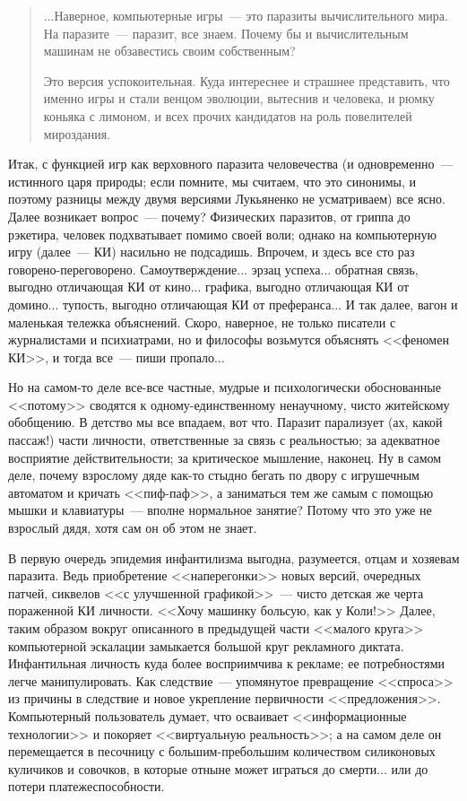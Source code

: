 \documentclass{scrbook}
\makeatletter
\newcommand{\flqq}{<<}
\newcommand{\frqq}{>>}
\newcommand{\mdash}{~--- }
\newcommand{\inlineauthor}[1]{\emph{#1}}
\newcommand{\myquotation}[2][\@empty]{
	\begin{quotation}
	#2

	\ifx\@empty#1
	\else
		\nopagebreak	
		\inlineauthor{#1}
	\fi
	\end{quotation}
}
\makeatother
\begin{document}
\myquotation{
...Наверное, компьютерные игры{\mdash}это паразиты вычислительного мира. На паразите{\mdash}паразит, все знаем. Почему бы и вычислительным машинам не обзавестись своим собственным?

Это версия успокоительная. Куда интереснее и страшнее представить, что именно игры и стали венцом эволюции, вытеснив и человека, и рюмку коньяка с лимоном, и всех прочих кандидатов на роль повелителей мироздания.
}

Итак, с функцией игр как верховного паразита человечества (и одновременно{\mdash}истинного царя природы; если помните, мы считаем, что это синонимы, и поэтому разницы между двумя версиями Лукьяненко не усматриваем) все ясно. Далее возникает вопрос{\mdash}почему? Физических паразитов, от гриппа до рэкетира, человек подхватывает помимо своей воли; однако на компьютерную игру (далее{\mdash}КИ) насильно не подсадишь. Впрочем, и здесь все сто раз говорено-переговорено. Самоутверждение... эрзац успеха... обратная связь, выгодно отличающая КИ от кино... графика, выгодно отличающая КИ от домино... тупость, выгодно отличающая КИ от преферанса... И так далее, вагон и маленькая тележка объяснений. Скоро, наверное, не только писатели с журналистами и психиатрами, но и философы возьмутся объяснять {\flqq}феномен КИ{\frqq}, и тогда все{\mdash}пиши пропало...

Но на самом-то деле все-все частные, мудрые и психологически обоснованные {\flqq}потому{\frqq} сводятся к одному-единственному ненаучному, чисто житейскому обобщению. В детство мы все впадаем, вот что. Паразит парализует (ах, какой пассаж!) части личности, ответственные за связь с реальностью; за адекватное восприятие действительности; за критическое мышление, наконец. Ну в самом деле, почему взрослому дяде как-то стыдно бегать по двору с игрушечным автоматом и кричать {\flqq}пиф-паф{\frqq}, а заниматься тем же самым с помощью мышки и клавиатуры{\mdash}вполне нормальное занятие? Потому что это уже не взрослый дядя, хотя сам он об этом не знает.

В первую очередь эпидемия инфантилизма выгодна, разумеется, отцам и хозяевам паразита. Ведь приобретение {\flqq}наперегонки{\frqq} новых версий, очередных патчей, сиквелов {\flqq}с улучшенной графикой{\frqq}{\mdash}чисто детская же черта пораженной КИ личности. {\flqq}Хочу машинку больсую, как у Коли!{\frqq} Далее, таким образом вокруг описанного в предыдущей части {\flqq}малого круга{\frqq} компьютерной эскалации замыкается большой круг рекламного диктата. Инфантильная личность куда более восприимчива к рекламе; ее потребностями легче манипулировать. Как следствие{\mdash}упомянутое превращение {\flqq}спроса{\frqq} из причины в следствие и новое укрепление первичности {\flqq}предложения{\frqq}. Компьютерный пользователь думает, что осваивает {\flqq}информационные технологии{\frqq} и покоряет {\flqq}виртуальную реальность{\frqq}; а на самом деле он перемещается в песочницу с большим-пребольшим количеством силиконовых куличиков и совочков, в которые отныне может играться до смерти... или до потери платежеспособности.
\end{document}
